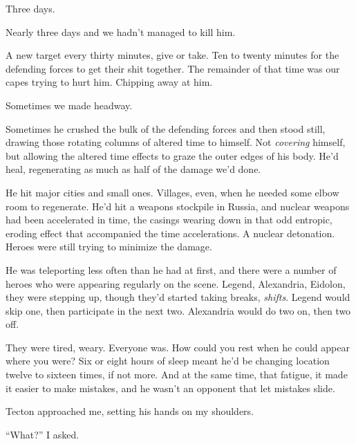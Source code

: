 





Three days.



Nearly three days and we hadn't managed to kill him.



A new target every thirty minutes, give or take.  Ten to twenty minutes for the defending forces to get their shit together.  The remainder of that time was our capes trying to hurt him.  Chipping away at him.



Sometimes we made headway.



Sometimes he crushed the bulk of the defending forces and then stood still, drawing those rotating columns of altered time to himself.  Not \emph{covering} himself, but allowing the altered time effects to graze the outer edges of his body.  He'd heal, regenerating as much as half of the damage we'd done.



He hit major cities and small ones.  Villages, even, when he needed some elbow room to regenerate.  He'd hit a weapons stockpile in Russia, and nuclear weapons had been accelerated in time, the casings wearing down in that odd entropic, eroding effect that accompanied the time accelerations.  A nuclear detonation.  Heroes were still trying to minimize the damage.



He was teleporting less often than he had at first, and there were a number of heroes who were appearing regularly on the scene.  Legend, Alexandria, Eidolon, they were stepping up, though they'd started taking breaks, \emph{shifts}.  Legend would skip one, then participate in the next two.  Alexandria would do two on, then two off.



They were tired, weary.  Everyone was.  How could you rest when he could appear where you were?  Six or eight hours of sleep meant he'd be changing location twelve to sixteen times, if not more.  And at the same time, that fatigue, it made it easier to make mistakes, and he wasn't an opponent that let mistakes slide.



Tecton approached me, setting his hands on my shoulders.



``What?'' I asked.



